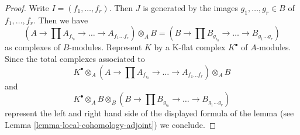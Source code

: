 \documentclass[10pt,a4paper]{amsart}
\theoremstyle{plain}
\theoremstyle{definition}
\theoremstyle{remark}
\numberwithin{equation}{subsection}
\begin{document}
\begin{proof}
Write $I = (f_1, \ldots, f_r)$. Then $J$ is generated by the images
$g_1, \ldots, g_r \in B$ of $f_1, \ldots, f_r$. Then we have
$$
(A \to \prod A_{f_{i_0}} \to \ldots \to A_{f_1\ldots f_r}) \otimes_A B =
(B \to \prod B_{g_{i_0}} \to \ldots \to B_{g_1\ldots g_r})
$$
as complexes of $B$-modules. Represent $K$ by a K-flat complex $K^\bullet$
of $A$-modules. Since the total complexes associated to
$$
K^\bullet \otimes_A
(A \to \prod A_{f_{i_0}} \to \ldots \to A_{f_1\ldots f_r}) \otimes_A B
$$
and
$$
K^\bullet \otimes_A B \otimes_B
(B \to \prod B_{g_{i_0}} \to \ldots \to B_{g_1\ldots g_r})
$$
represent the left and right hand side of the displayed formula of the
lemma (see Lemma \ref{lemma-local-cohomology-adjoint}) we conclude.
\end{proof}
\end{document}
